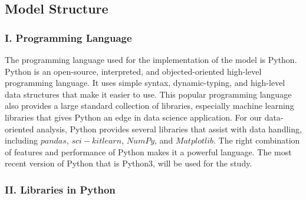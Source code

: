 \subsection{Model Structure}

\subsubsection{I. Programming Language}
\hspace{20pt}The programming language used for the implementation of the model is Python. Python is an open-source, interpreted, and objected-oriented high-level programming language. It uses simple syntax, dynamic-typing, and high-level data structures that make it easier to use. This popular programming language also provides a large standard collection of libraries, especially machine learning libraries that gives Python an edge in data science application. For our data-oriented analysis, Python provides several libraries that assist with data handling, including $pandas$, $sci-kit learn $, $NumPy$, and $Matplotlib$. The right combination of features and performance of Python makes it a powerful language. The most recent version of Python that is Python3, will be used for the study.

\subsubsection{II. Libraries in Python}

